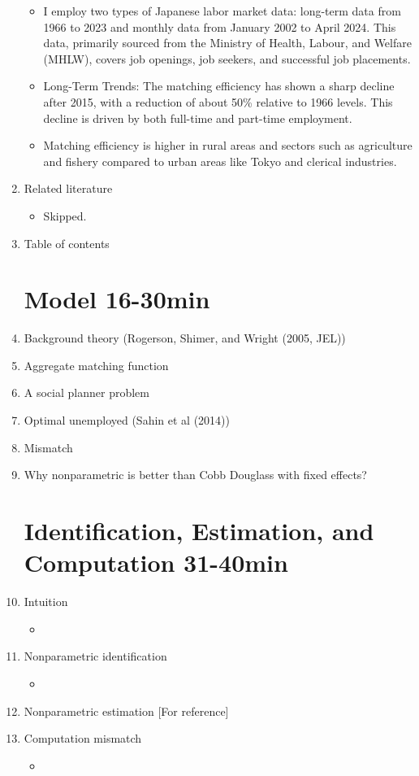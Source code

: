 \documentclass[12pt]{article}
\begin{document}
\begin{enumerate}
\begin{itemize}
        \item I employ two types of Japanese labor market data: long-term data from 1966 to 2023 and monthly data from January 2002 to April 2024. This data, primarily sourced from the Ministry of Health, Labour, and Welfare (MHLW), covers job openings, job seekers, and successful job placements.
        \item Long-Term Trends: The matching efficiency has shown a sharp decline after 2015, with a reduction of about 50\% relative to 1966 levels. This decline is driven by both full-time and part-time employment.
        \item Matching efficiency is higher in rural areas and sectors such as agriculture and fishery compared to urban areas like Tokyo and clerical industries.
    \end{itemize}
    \item Related literature
    \begin{itemize}
        \item Skipped.
    \end{itemize}
    \item Table of contents
\section{Model 16-30min}
    \item Background theory (Rogerson, Shimer, and Wright (2005, JEL))
    \item Aggregate matching function
    \item A social planner problem
    \item Optimal unemployed (Sahin et al (2014))
    \item Mismatch
    \item Why nonparametric is better than Cobb Douglass with fixed effects?
    
\section{Identification, Estimation, and Computation 31-40min}
    \item Intuition
    \begin{itemize}
        \item 
    \end{itemize}
    \item Nonparametric identification
    \begin{itemize}
        \item 
    \end{itemize}
    \item Nonparametric estimation [For reference]
    \item Computation mismatch
    \begin{itemize}
        \item 
    \end{itemize}

\end{enumerate}
\end{document}

